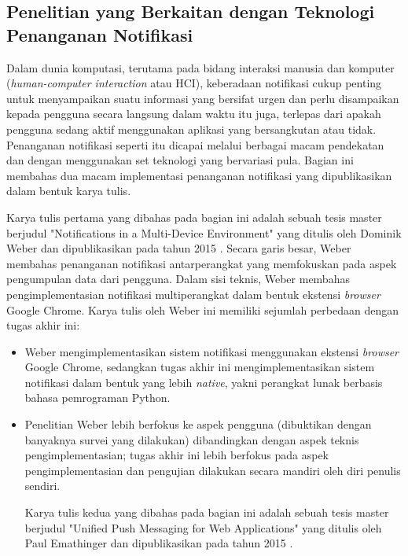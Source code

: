 \subsection{Penelitian yang Berkaitan dengan Teknologi Penanganan Notifikasi}

Dalam dunia komputasi, terutama pada bidang interaksi manusia dan komputer (\textit{human-computer interaction} atau HCI), keberadaan notifikasi cukup penting untuk menyampaikan suatu informasi yang bersifat urgen dan perlu disampaikan kepada pengguna secara langsung dalam waktu itu juga, terlepas dari apakah pengguna sedang aktif menggunakan aplikasi yang bersangkutan atau tidak. Penanganan notifikasi seperti itu dicapai melalui berbagai macam pendekatan dan dengan menggunakan set teknologi yang bervariasi pula. Bagian ini membahas dua macam implementasi penanganan notifikasi yang dipublikasikan dalam bentuk karya tulis.

Karya tulis pertama yang dibahas pada bagian ini adalah sebuah tesis master berjudul "Notifications in a Multi-Device Environment" yang ditulis oleh Dominik Weber dan dipublikasikan pada tahun 2015 \cite{weber2015notifications}. Secara garis besar, Weber membahas penanganan notifikasi antarperangkat yang memfokuskan pada aspek pengumpulan data dari pengguna. Dalam sisi teknis, Weber membahas pengimplementasian notifikasi multiperangkat dalam bentuk ekstensi \textit{browser} Google Chrome. Karya tulis oleh Weber ini memiliki sejumlah perbedaan dengan tugas akhir ini:
\begin{itemize}
    \item Weber mengimplementasikan sistem notifikasi menggunakan ekstensi \textit{browser} Google Chrome, sedangkan tugas akhir ini mengimplementasikan sistem notifikasi dalam bentuk yang lebih \textit{native}, yakni perangkat lunak berbasis bahasa pemrograman Python.

    \item Penelitian Weber lebih berfokus ke aspek pengguna (dibuktikan dengan banyaknya survei yang dilakukan) dibandingkan dengan aspek teknis pengimplementasian; tugas akhir ini lebih berfokus pada aspek pengimplementasian dan pengujian dilakukan secara mandiri oleh diri penulis sendiri.

Karya tulis kedua yang dibahas pada bagian ini adalah sebuah tesis master berjudul "Unified Push Messaging for Web Applications" yang ditulis oleh Paul Emathinger dan dipublikasikan pada tahun 2015 \cite{emathinger2015unified}. 
\end{itemize}

